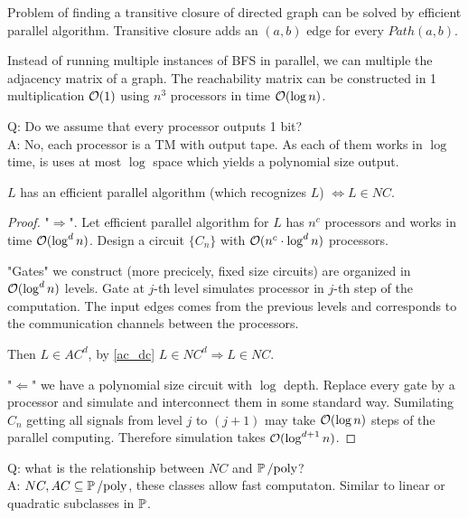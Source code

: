 \begin{example}
	Problem of finding a transitive closure of directed graph can be solved by efficient parallel algorithm.
	Transitive closure adds an $(a, b)$ edge for every $Path(a, b)$.

	Instead of running multiple instances of BFS in parallel, we can multiple the adjacency matrix of a graph.
	The reachability matrix can be constructed in 1 multiplication $\mathcal{O}(1)$ using $n^3$ processors in time $\mathcal{O}(\log n)$.
\end{example}

Q: Do we assume that every processor outputs 1 bit?\\
A: No, each processor is a TM with output tape. As each of them works in $\log$ time, is uses at most $\log$ space which yields a polynomial size output.

\begin{theorem}
	$L$ has an efficient parallel algorithm (which recognizes $L$) $\iff L \in NC$.
\end{theorem}
\begin{proof}
	"$\Rightarrow$". Let efficient parallel algorithm for $L$ has $n^c$ processors and works in time $\mathcal{O}(\log^d n)$.
	Design a circuit $\{ C_n \}$ with $\mathcal{O}(n^c \cdot \log^d n)$ processors.

	"Gates" we construct (more precicely, fixed size circuits) are organized in $\mathcal{O}(\log^d n)$ levels.
	Gate at $j$-th level simulates processor in $j$-th step of the computation.
	The input edges comes from the previous levels and corresponds to the communication channels between the processors.

	Then $L \in AC^d$, by \cref{ac_dc} $L \in NC^d \Rightarrow L \in NC$.

	"$\Leftarrow$" we have a polynomial size circuit with $\log$ depth.
	Replace every gate by a processor and simulate and interconnect them in some standard way.
	Sumilating $C_n$ getting all signals from level $j$ to $(j + 1)$ may take $\mathcal{O}(\log n)$ steps of the parallel computing.
	Therefore simulation takes $\mathcal{O}(\log^{d + 1} n)$.
\end{proof}

Q: what is the relationship between $NC$ and $\operatorname{\operatorname{\mathbb{P}}/poly}$?\\
A: $NC, AC \subseteq \operatorname{\operatorname{\mathbb{P}}/poly}$, these classes allow fast computaton. Similar to linear or quadratic subclasses in $\operatorname{\mathbb{P}}$.
